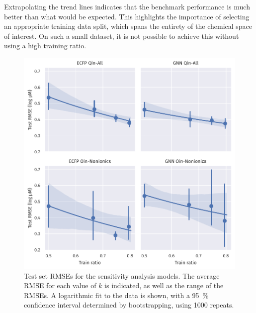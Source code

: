 Extrapolating the trend lines indicates that the benchmark performance is much
better than what would be expected. This highlights the importance of selecting
an appropriate training data split, which spans the entirety of the chemical
space of interest. On such a small dataset, it is not possible to achieve this
without using a high training ratio.

\begin{figure}
    \includegraphics[width=\textwidth]{images/sensitivity-plots.pdf}
    \caption{Test set RMSEs for the sensitivity analysis models. The average
        RMSE for each value of $k$ is indicated, as well as the range of the RMSEs.
        A logarithmic fit to the data is shown, with a \SI{95}{\%} confidence
        interval determined by bootstrapping, using \num{1000} repeats.}
    \label{fig:sensitivity}
\end{figure}